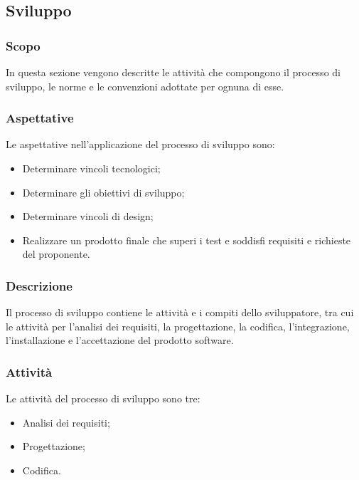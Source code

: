\subsection{Sviluppo}
\subsubsection{Scopo}
In questa sezione vengono descritte le attività che compongono il processo di sviluppo, le norme e le convenzioni adottate per ognuna di esse.
\subsubsection{Aspettative}
Le aspettative nell'applicazione del processo di sviluppo sono:
\begin{itemize}
\item Determinare vincoli tecnologici;
\item Determinare gli obiettivi di sviluppo;
\item Determinare vincoli di design;
\item Realizzare un prodotto finale che superi i test e soddisfi requisiti e richieste del proponente.
\end{itemize}
\subsubsection{Descrizione}
Il processo di sviluppo contiene le attività e i compiti dello sviluppatore, tra cui le attività per l'analisi dei requisiti, la progettazione, la codifica, l'integrazione, l'installazione e l'accettazione del prodotto software.
\subsubsection{Attività}
Le attività del processo di sviluppo sono tre:
\begin{itemize}
\item Analisi dei requisiti;
\item Progettazione;
\item Codifica.
\end{itemize}

